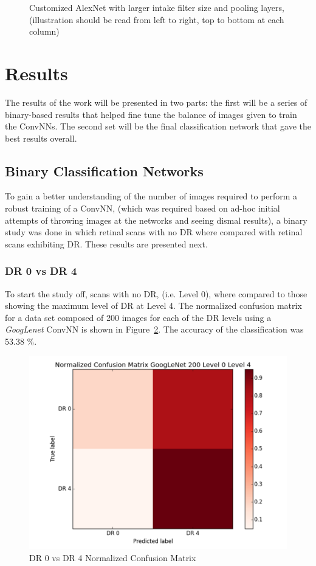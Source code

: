 \documentclass[letterpaper,12pt]{article}
\newcommand{\figref}[1]{Figure~\ref{#1}}
\begin{document}
\begin{figure}[htbp]
\begin{center}
\caption{Customized AlexNet with larger intake filter size and pooling layers, (illustration should be read from left to right, top to bottom at each column)}
\label{alexnet}
\end{center}
\end{figure}

\section{Results}

The results of the work will be presented in two parts: the first will be a series of binary-based results that helped fine tune the balance of images given to train the ConvNNs. The second set will be the final classification network that gave the best results overall. 

\subsection{Binary Classification Networks}

To gain a better understanding of the number of images required to perform a robust training of a ConvNN, (which was required based on ad-hoc initial attempts of throwing images at the networks and seeing dismal results), a binary study was done in which retinal scans with no DR where compared with retinal scans exhibiting DR. These results are presented next.

\subsubsection{DR 0 vs DR 4}

To start the study off, scans with no DR, (i.e. Level 0), where compared to those showing the maximum level of DR at Level 4. The normalized confusion matrix for a data set composed of 200 images for each of the DR levels using a \textit{GoogLenet} ConvNN is shown in \figref{DR0_DR4}. The accuracy of the classification was 53.38 $\%$.

\begin{figure}[htbp]
\begin{center}
\includegraphics[scale=0.5]{images/Normalized_DR0_DR4.png}
\caption{DR 0 vs DR 4 Normalized Confusion Matrix}
\label{DR0_DR4}
\end{center}
\end{figure}
\end{document}
